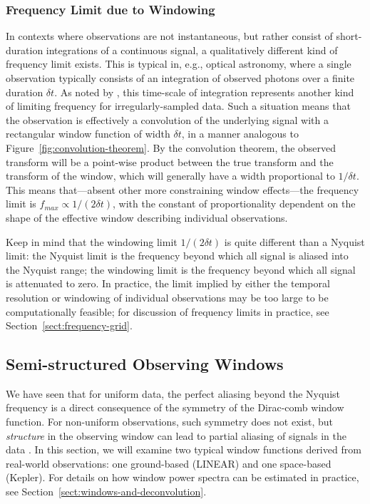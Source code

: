 \documentclass[preprint]{aastex}
\newcommand{\fig}[1]{Figure~\ref{fig:#1}}
\newcommand{\Sect}[1]{Section~\ref{sect:#1}}
\newcommand{\sect}[1]{\Sect{#1}}
\begin{document}
\subsubsection{Frequency Limit due to Windowing}

In contexts where observations are not instantaneous, but rather consist of
short-duration integrations of a continuous signal, a qualitatively different
kind of frequency limit exists.
This is typical in, e.g., optical astronomy, where a single observation typically consists of an integration of observed photons over a finite duration $\delta t$.
As noted by \citet{ICVG2014}, this time-scale of integration represents another
kind of limiting frequency for irregularly-sampled data.
Such a situation means that the observation is effectively a convolution of
the underlying signal with a rectangular window function of width $\delta t$,
in a manner analogous to \fig{convolution-theorem}.
By the convolution theorem, the observed transform will be a point-wise
product between the true transform and the transform of the window, which
will generally have a width proportional to $1/\delta t$.
This means that---absent other more constraining window effects---the
frequency limit is $f_{max} \propto 1/(2\delta t)$, with the constant of
proportionality dependent on the shape of the effective window describing
individual observations.

Keep in mind that the windowing limit $1/(2\delta t)$ is quite different than a
Nyquist limit: the Nyquist limit is the frequency beyond which all signal
is aliased into the Nyquist range; the windowing limit is the frequency
beyond which all signal is attenuated to zero.
In practice, the limit implied by either the temporal resolution or windowing
of individual observations may be too large to be computationally feasible;
for discussion of frequency limits in practice, see \sect{frequency-grid}.

\subsection{Semi-structured Observing Windows}

We have seen that for uniform data, the perfect aliasing beyond the Nyquist
frequency is a direct consequence of the symmetry of the Dirac-comb window
function.
For non-uniform observations, such symmetry does not exist, but {\it structure}
in the observing window can lead to partial aliasing of signals in the
data \citep[see, e.g.][]{Deeming75}.
In this section, we will examine two typical window functions derived from
real-world observations: one ground-based (LINEAR) and one space-based (Kepler).
For details on how window power spectra can be estimated in practice, see
\sect{windows-and-deconvolution}.
\end{document}
